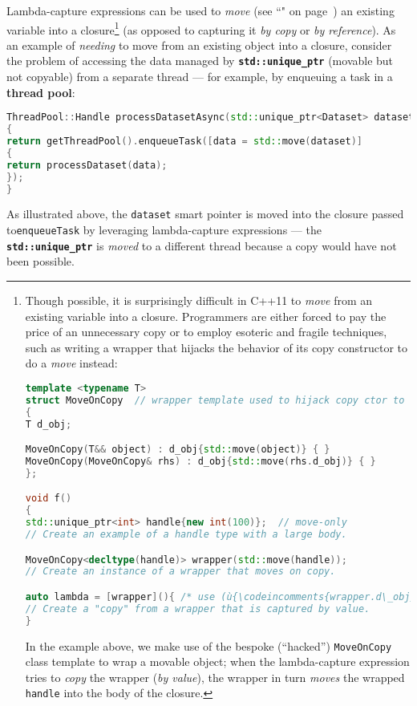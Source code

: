 Lambda-capture expressions can be used to \emph{move} (see
``" on page~\pageref{Rvalue-References}) an existing variable into a
closure{\cprotect\footnote{Though possible, it is surprisingly difficult
in C++11 to \emph{move} from an existing variable into a closure.
Programmers are either forced to pay the price of an unnecessary copy or to employ esoteric and fragile techniques, such as writing a wrapper
that hijacks the behavior of its copy constructor to do a \emph{move}
instead:

\begin{lstlisting}[language=C++, basicstyle={\ttfamily\footnotesize}]
template <typename T>
struct MoveOnCopy  // wrapper template used to hijack copy ctor to do move
{
T d_obj;

MoveOnCopy(T&& object) : d_obj{std::move(object)} { }
MoveOnCopy(MoveOnCopy& rhs) : d_obj{std::move(rhs.d_obj)} { }
};

void f()
{
std::unique_ptr<int> handle{new int(100)};  // move-only
// Create an example of a handle type with a large body.

MoveOnCopy<decltype(handle)> wrapper(std::move(handle));
// Create an instance of a wrapper that moves on copy.

auto lambda = [wrapper](){ /* use (ù{\codeincomments{wrapper.d\_obj}}ù) */ };
// Create a "copy" from a wrapper that is captured by value.
}
\end{lstlisting}

\noindent In the example above, we make use of the bespoke (``hacked'')
\texttt{MoveOnCopy} class template to wrap a movable object;
when the lambda-capture expression tries to \emph{copy} the wrapper (\textit{by value}),
the wrapper in turn \emph{moves} the wrapped
\texttt{handle} into the body of the closure.}} (as opposed to
capturing it \emph{by copy} or \emph{by reference}). As an example of
\emph{needing} to move from an existing object into a closure, consider
the problem of accessing the data managed by
\textbf{\texttt{std::unique\_ptr}} (movable but not copyable) from a
separate thread --- for example, by enqueuing a task in a \textbf{thread
pool}:

\begin{lstlisting}[language=C++]
ThreadPool::Handle processDatasetAsync(std::unique_ptr<Dataset> dataset)
{
return getThreadPool().enqueueTask([data = std::move(dataset)]
{
return processDataset(data);
});
}
\end{lstlisting}

\noindent As illustrated above, the \texttt{dataset} smart pointer is moved into
the closure passed to\linebreak[4] \mbox{\texttt{enqueueTask}} by leveraging lambda-capture
expressions --- the \textbf{\texttt{std::unique\_ptr}} is \emph{moved}
to a different thread because a copy would have not been possible.

